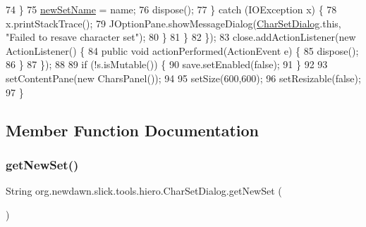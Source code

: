 \begin{DoxyCode}
74                     \}
75                     \mbox{\hyperlink{classorg_1_1newdawn_1_1slick_1_1tools_1_1hiero_1_1_char_set_dialog_ab55224706d481bb64c291389c69e65c3}{newSetName}} = name;
76                     dispose();
77                 \} \textcolor{keywordflow}{catch} (IOException x) \{
78                     x.printStackTrace();
79                     JOptionPane.showMessageDialog(\mbox{\hyperlink{classorg_1_1newdawn_1_1slick_1_1tools_1_1hiero_1_1_char_set_dialog_ad98e518276c347b0735f423346969033}{CharSetDialog}}.this, \textcolor{stringliteral}{"Failed to resave
       character set"});
80                 \}
81             \}
82         \});
83         close.addActionListener(\textcolor{keyword}{new} ActionListener() \{
84             \textcolor{keyword}{public} \textcolor{keywordtype}{void} actionPerformed(ActionEvent e) \{
85                 dispose();
86             \}
87         \});
88         
89         \textcolor{keywordflow}{if} (!s.isMutable()) \{
90             save.setEnabled(\textcolor{keyword}{false});
91         \}
92         
93         setContentPane(\textcolor{keyword}{new} CharsPanel());
94         
95         setSize(600,600);
96         setResizable(\textcolor{keyword}{false});
97     \}
\end{DoxyCode}


\subsection{Member Function Documentation}
\mbox{\label{classorg_1_1newdawn_1_1slick_1_1tools_1_1hiero_1_1_char_set_dialog_a2f4151632bd5b7d66bc342671e13c303}} 
\subsubsection{\texorpdfstring{get\+New\+Set()}{getNewSet()}}
{\footnotesize\ttfamily String org.\+newdawn.\+slick.\+tools.\+hiero.\+Char\+Set\+Dialog.\+get\+New\+Set (\begin{DoxyParamCaption}{ }\end{DoxyParamCaption})\hspace{0.3cm}{\ttfamily [inline]}}

